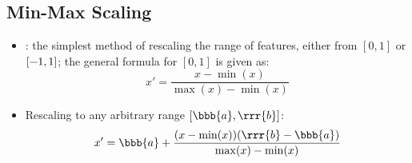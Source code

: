 \begin{itemize}
  \subsection{Min-Max Scaling}
  \begin{itemize}
    \item {}: the simplest method of rescaling the range of features, either from \([0,1]\) or \([\text{\textminus}1,1]\); the general formula for \([0,1]\) is given as:
    \[%
    x'=\frac{x-\min(x)}{\max(x)-\min(x)}
    \]%
    \item Rescaling to any arbitrary range \([\bbb{a},\rrr{b}]\):
    \[%
    x'=\bbb{a}+\frac{(x-\min(x))(\rrr{b}-\bbb{a})}{\max(x)-\min(x)}
    \]%
    
  \end{itemize}
  


\end{itemize}
